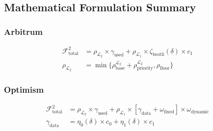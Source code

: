 \documentclass[letterpaper,10pt]{article} %
\newcommand{\layer}[1]{\mathcal{L}_{#1}}
\newcommand{\fee}[2]{\mathcal{F}_{#1}^{#2}}
\begin{document}
\subsection{Mathematical Formulation Summary} %

\subsubsection{Arbitrum} %
\begin{align}
\fee{\text{total}}{2} &= \rho_{\layer{2}} \times \gamma_{\text{used}} + \rho_{\layer{1}} \times \zeta_{\text{brotli}}(\delta) \times c_1 \\
\rho_{\layer{2}} &= \min\{\rho_{\text{base}}^{\layer{2}} + \rho_{\text{priority}}^{\layer{2}}, \rho_{\text{floor}}\}
\end{align}

\subsubsection{Optimism} %
\begin{align}
\fee{\text{total}}{2} &= \rho_{\layer{2}} \times \gamma_{\text{used}} + \rho_{\layer{1}} \times [\gamma_{\text{data}} + \omega_{\text{fixed}}] \times \omega_{\text{dynamic}} \\
\gamma_{\text{data}} &= \eta_0(\delta) \times c_0 + \eta_1(\delta) \times c_1
\end{align}
\end{document}
